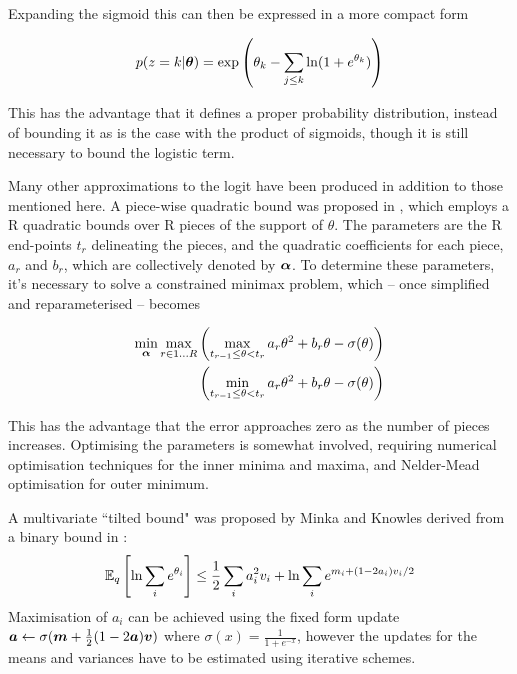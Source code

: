 Expanding the sigmoid this can then be expressed in a more compact form

\begin{equation}
p(z = k | \vv{\theta}) = \exp \left( \theta_k - \sum_{j \leq k} \ln (1 + e^{\theta_k}) \right)
\end{equation}

This has the advantage that it defines a proper probability distribution, instead of bounding it as is the case with the product of sigmoids, though it is still necessary to bound the logistic term.

Many other approximations to the logit have been produced in addition to those mentioned here. A piece-wise quadratic bound was proposed in \cite{Marlin2011}, which employs a R quadratic bounds over R pieces of the support of $\theta$. The parameters are the R end-points $t_r$ delineating the pieces, and the quadratic coefficients for each piece, $a_r$ and $b_r$, which are collectively denoted by $\vv{\alpha}$. To determine these parameters, it's necessary to solve a constrained minimax problem, which -- once simplified and reparameterised -- becomes 

\begin{align}
\begin{split}
\min_{\vv{\alpha}} \max_{r \in {1 \ldots R}}
 & \left(  \max_{t_{r-1} \leq \theta < t_r} a_r \theta^2 + b_r \theta - \sigma(\theta) \right) \\
 & \left(  \min_{t_{r-1} \leq \theta < t_r} a_r \theta^2 + b_r \theta - \sigma(\theta)  \right)
\end{split}
\end{align}

This has the advantage that the error approaches zero as the number of pieces increases. Optimising the parameters is somewhat involved, requiring numerical optimisation techniques for the inner minima and maxima, and Nelder-Mead optimisation for outer minimum.

A multivariate ``tilted bound" was proposed by Minka and Knowles\cite{MinkaKnowles} derived from a binary bound in \cite{SaulJordan1998}:
\begin{equation}
\ex{\ln \sum_i e^{\theta_i}}{q} \leq \half \sum_i a_i^2 v_i + \ln \sum_i e^{m_i + (1-2a_i)v_i/2}
\end{equation}
Maximisation of $a_i$ can be achieved using the fixed form update $\vv{a} \leftarrow \sigma(\vv{m} + \half(1 - 2 \vv{a})\vv{v})$ where $\sigma(x) = \frac{1}{1 + e^{-x}}$, however the updates for the means and variances have to be estimated using iterative schemes. 

